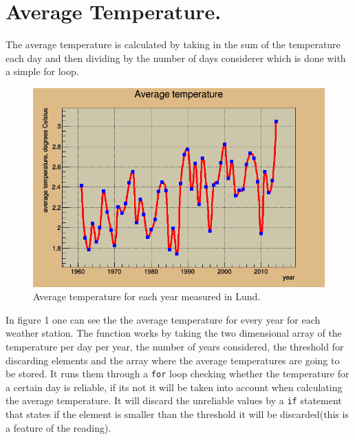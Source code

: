 
\section*{Average Temperature.}
The average temperature is calculated by taking in the sum of the temperature each day and then dividing by the number of days considerer which is done with a simple for loop.

\begin{figure}
	\centering
	\includegraphics[width=0.8 \textwidth]{lund.png}
	\caption{Average temperature for each year measured in Lund.}
\end{figure}
In figure 1 one can see the the average temperature for every year for each weather station. 
The function works by taking the two dimensional array of the temperature per day per year, the number of years considered, the threshold for discarding elements and the array where the average temperatures are going to be stored. It runs them through a \texttt{for} loop checking whether the temperature for a certain day is reliable, if its not it will be taken into account  when calculating the average temperature. It will discard the unreliable values by a \texttt{if} statement that states if the element is smaller than the threshold it will be discarded(this is a feature of the reading).